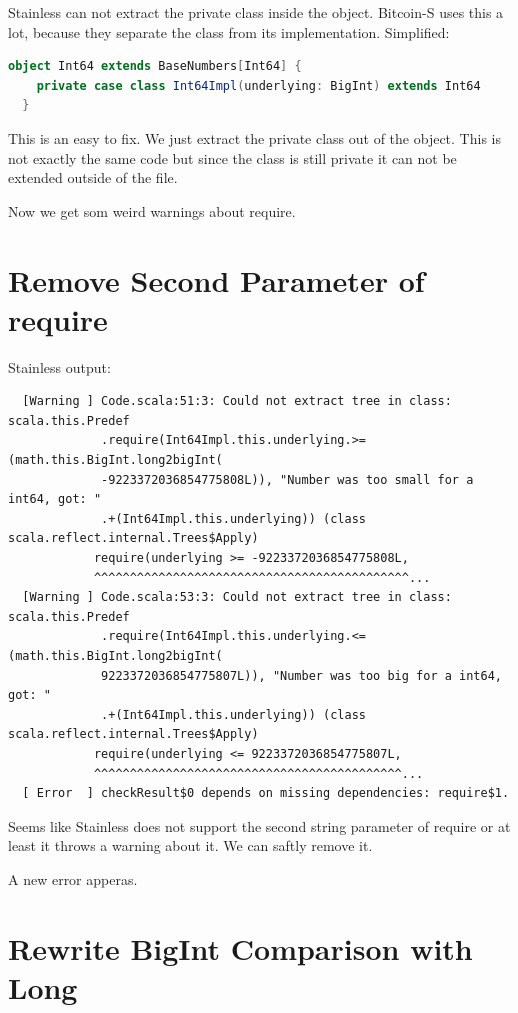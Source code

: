 Stainless can not extract the private class inside the object.
Bitcoin-S uses this a lot, because they separate the class from its implementation.
Simplified:
\begin{lstlisting}[language=scala]
  object Int64 extends BaseNumbers[Int64] {
    private case class Int64Impl(underlying: BigInt) extends Int64 
  }
\end{lstlisting}

This is an easy to fix.
We just extract the private class out of the object.
This is not exactly the same code but since the class is still private it can not be extended outside of the file.

Now we get som weird warnings about require.


\section{Remove Second Parameter of require}

Stainless output:
{\footnotesize\begin{verbatim}
  [Warning ] Code.scala:51:3: Could not extract tree in class: scala.this.Predef
             .require(Int64Impl.this.underlying.>=(math.this.BigInt.long2bigInt(
             -9223372036854775808L)), "Number was too small for a int64, got: "
             .+(Int64Impl.this.underlying)) (class scala.reflect.internal.Trees$Apply)
            require(underlying >= -9223372036854775808L,
            ^^^^^^^^^^^^^^^^^^^^^^^^^^^^^^^^^^^^^^^^^^^^...
  [Warning ] Code.scala:53:3: Could not extract tree in class: scala.this.Predef
             .require(Int64Impl.this.underlying.<=(math.this.BigInt.long2bigInt(
             9223372036854775807L)), "Number was too big for a int64, got: "
             .+(Int64Impl.this.underlying)) (class scala.reflect.internal.Trees$Apply)
            require(underlying <= 9223372036854775807L,
            ^^^^^^^^^^^^^^^^^^^^^^^^^^^^^^^^^^^^^^^^^^^...
  [ Error  ] checkResult$0 depends on missing dependencies: require$1.
\end{verbatim}}

Seems like Stainless does not support the second string parameter of require or at least it throws a warning about it.
We can saftly remove it.

A new error apperas.


\section{Rewrite BigInt Comparison with Long}

